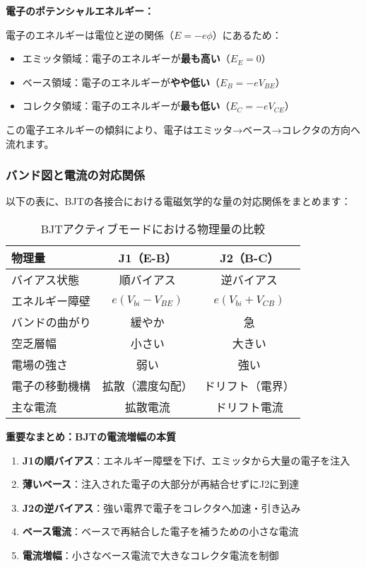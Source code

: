 \textbf{電子のポテンシャルエネルギー：}

電子のエネルギーは電位と逆の関係（$E = -e\phi$）にあるため：

\begin{itemize}
\item エミッタ領域：電子のエネルギーが\textbf{最も高い}（$E_E = 0$）
\item ベース領域：電子のエネルギーが\textbf{やや低い}（$E_B = -eV_{BE}$）
\item コレクタ領域：電子のエネルギーが\textbf{最も低い}（$E_C = -eV_{CE}$）
\end{itemize}

この電子エネルギーの傾斜により、電子はエミッタ→ベース→コレクタの方向へ流れます。

\subsubsection{バンド図と電流の対応関係}

以下の表に、BJTの各接合における電磁気学的な量の対応関係をまとめます：

\begin{table}[H]
\centering
\caption{BJTアクティブモードにおける物理量の比較}
\begin{tabular}{|l|c|c|}
\hline
\textbf{物理量} & \textbf{J1（E-B）} & \textbf{J2（B-C）} \\
\hline
バイアス状態 & 順バイアス & 逆バイアス \\
\hline
エネルギー障壁 & $e(V_{bi} - V_{BE})$ & $e(V_{bi} + V_{CB})$ \\
\hline
バンドの曲がり & 緩やか & 急 \\
\hline
空乏層幅 & 小さい & 大きい \\
\hline
電場の強さ & 弱い & 強い \\
\hline
電子の移動機構 & 拡散（濃度勾配） & ドリフト（電界） \\
\hline
主な電流 & 拡散電流 & ドリフト電流 \\
\hline
\end{tabular}
\end{table}

\textbf{重要なまとめ：BJTの電流増幅の本質}

\begin{enumerate}
\item \textbf{J1の順バイアス}：エネルギー障壁を下げ、エミッタから大量の電子を注入
\item \textbf{薄いベース}：注入された電子の大部分が再結合せずにJ2に到達
\item \textbf{J2の逆バイアス}：強い電界で電子をコレクタへ加速・引き込み
\item \textbf{ベース電流}：ベースで再結合した電子を補うための小さな電流
\item \textbf{電流増幅}：小さなベース電流で大きなコレクタ電流を制御
\end{enumerate}

